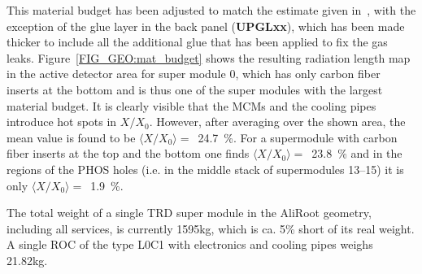 \documentclass{alicetdr}
\begin{document}
This material budget has been adjusted to match the estimate given 
in~\cite{CLEMENS}, with the exception of the glue layer in the back panel
({\bf UPGLxx}), which has been made thicker to include all the additional
glue that has been applied to fix the gas leaks.  Figure~\ref{FIG_GEO:mat_budget}
shows the resulting radiation length map in the active detector area for
super module 0, which has only carbon fiber inserts at the bottom and is
thus one of the super modules with the largest material budget.  It is
clearly visible that the MCMs and the cooling pipes introduce hot spots
in $X/X_{0}$.  However, after averaging over the shown area, the mean
value is found to be $\langle X/X_{0}\rangle =$~24.7~\%.  For a supermodule
with carbon fiber inserts at the top and the bottom one finds
$\langle X/X_{0}\rangle =$~23.8~\% and in the regions of the PHOS holes (i.e.
in the middle stack of supermodules 13--15) it is only 
$\langle X/X_{0}\rangle =$~1.9~\%.

The total weight of a single TRD super module in the AliRoot geometry, 
including all services, is currently 1595kg, which is ca. 5\% short of its
real weight.  A single ROC of the type L0C1 with electronics and cooling 
pipes weighs 21.82kg.
%
\end{document}
